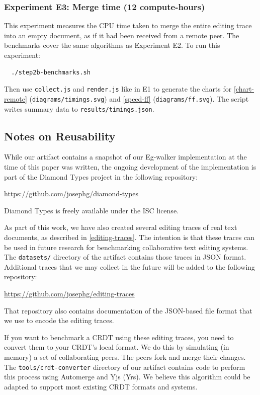 \documentclass[sigplan,10pt]{acmart}
\begin{document}
\subsubsection{Experiment E3: Merge time (12 compute-hours)}

This experiment measures the CPU time taken to merge the entire editing trace into an empty document, as if it had been received from a remote peer.
The benchmarks cover the same algorithms as Experiment E2.
To run this experiment:
\begin{verbatim}
  ./step2b-benchmarks.sh
\end{verbatim}
Then use \verb|collect.js| and \verb|render.js| like in E1 to generate the charts for \autoref{chart-remote} (\verb|diagrams/timings.svg|) and \autoref{speed-ff} (\verb|diagrams/ff.svg|).
The script writes summary data to \verb|results/timings.json|.

\subsection{Notes on Reusability}

While our artifact contains a snapshot of our Eg-walker implementation at the time of this paper was written, the ongoing development of the implementation is part of the Diamond Types project in the following repository:

\url{https://github.com/josephg/diamond-types}

Diamond Types is freely available under the ISC license.

As part of this work, we have also created several editing traces of real text documents, as described in \autoref{editing-traces}.
The intention is that these traces can be used in future research for benchmarking collaborative text editing systems.
The \verb|datasets/| directory of the artifact contains those traces in JSON format.
Additional traces that we may collect in the future will be added to the following repository:

\url{https://github.com/josephg/editing-traces}

That repository also contains documentation of the JSON-based file format that we use to encode the editing traces.

If you want to benchmark a CRDT using these editing traces, you need to convert them to your CRDT's local format. We do this by simulating (in memory) a set of collaborating peers. The peers fork and merge their changes. The \texttt{tools/crdt-converter} directory of our artifact contains code to perform this process using Automerge and Yjs (Yrs). We believe this algorithm could be adapted to support most existing CRDT formats and systems.
\end{document}
